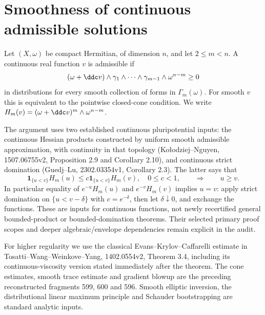 \section{Smoothness of continuous admissible solutions}

Let $(X,\omega)$ be compact Hermitian, of dimension $n$, and let
$2\leq m<n$. A continuous real function $v$ is admissible if
\[
 (\omega+\ddc v)\wedge\gamma_1\wedge\cdots\wedge\gamma_{m-1}
                              \wedge\omega^{n-m}\geq0
\]
in distributions for every smooth collection of forms in
$\Gamma_m(\omega)$. For smooth $v$ this is equivalent to the pointwise
closed-cone condition. We write
$H_m(v)=(\omega+\ddc v)^m\wedge\omega^{n-m}$.

The argument uses two established continuous pluripotential inputs:
the continuous Hessian products constructed by uniform smooth admissible
approximation, with continuity in that topology (Ko\l odziej--Nguyen,
1507.06755v2, Proposition 2.9 and Corollary 2.10), and continuous strict
domination (Guedj--Lu, 2302.03354v1, Corollary 2.3). The latter says that
\[
 \mathbf1_{\{u<v\}}H_m(u)\leq c\mathbf1_{\{u<v\}}H_m(v),\quad 0\leq c<1,
 \qquad\Longrightarrow\qquad u\geq v.
\]
In particular equality of $e^{-u}H_m(u)$ and $e^{-v}H_m(v)$ implies
$u=v$: apply strict domination on $\{u<v-\delta\}$ with
$c=e^{-\delta}$, then let $\delta\downarrow0$, and exchange the functions.
These are inputs for continuous functions, not newly recertified general
bounded-product or bounded-domination theorems. Their selected primary
proof scopes and deeper algebraic/envelope dependencies remain explicit
in the audit.

For higher regularity we use the classical Evans--Krylov--Caffarelli
estimate in Tosatti--Wang--Weinkove--Yang, 1402.0554v2, Theorem 3.4,
including its continuous-viscosity version stated immediately after the
theorem. The cone estimates, smooth trace estimate and gradient blowup
are the preceding reconstructed fragments 599, 600 and 596. Smooth
elliptic inversion, the distributional linear maximum principle and
Schauder bootstrapping are standard analytic inputs.


